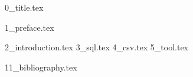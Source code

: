 \documentclass[11pt]{book}
\begin{document}
{0_title.tex}

\tableofcontents
\listoffigures
\listoftables
\lstlistoflistings

\renewcommand{\chaptermark}[1]{\markboth{\normalsize\sffamily\bfseries\ #1}{}} %
{1_preface.tex}

\renewcommand{\chaptermark}[1]{\markboth{\normalsize\sffamily\bfseries\chaptername\ \thechapter.\ #1}{}} %
\mainmatter

{2_introduction.tex}
{3_sql.tex}
{4_csv.tex}
{5_tool.tex}

\appendix

\backmatter
{11_bibliography.tex}
\end{document}
